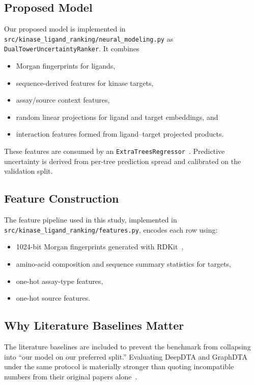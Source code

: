 \documentclass[11pt]{article}
\begin{document}
\subsection{Proposed Model}

Our proposed model is implemented in
\texttt{src/kinase\_ligand\_ranking/neural\_modeling.py} as
\texttt{DualTowerUncertaintyRanker}. It combines

\begin{itemize}[leftmargin=1.5em]
  \item Morgan fingerprints for ligands,
  \item sequence-derived features for kinase targets,
  \item assay/source context features,
  \item random linear projections for ligand and target embeddings, and
  \item interaction features formed from ligand--target projected products.
\end{itemize}

These features are consumed by an \texttt{ExtraTreesRegressor}~\cite{extra_trees}. Predictive
uncertainty is derived from per-tree prediction spread and calibrated on the
validation split.

\subsection{Feature Construction}

The feature pipeline used in this study, implemented in
\texttt{src/kinase\_ligand\_ranking/features.py}, encodes each row using:

\begin{itemize}[leftmargin=1.5em]
  \item 1024-bit Morgan fingerprints generated with RDKit~\cite{ecfp,rdkit},
  \item amino-acid composition and sequence summary statistics for targets,
  \item one-hot assay-type features,
  \item one-hot source features.
\end{itemize}

\subsection{Why Literature Baselines Matter}

The literature baselines are included to prevent the benchmark from collapsing
into ``our model on our preferred split.'' Evaluating DeepDTA and GraphDTA
under the same protocol is materially stronger than quoting incompatible
numbers from their original papers alone~\cite{deepdta,graphdta}.
\end{document}
